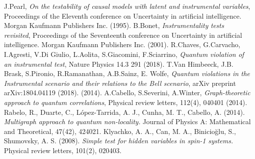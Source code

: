 \documentclass[
    nofootinbin,
    floatfix,
    amsfonts,
    twocolumn, 
    aps, 
    prl]{revtex4-1}
\begin{document}
\begin{thebibliography}{}
     J.Pearl, {\em On the testability of causal models with
        latent and instrumental variables}, 
        Proceedings of the Eleventh conference on Uncertainty in artificial
        intelligence. Morgan Kaufmann Publishers Inc. (1995).
     B.Bonet, {\em Instrumentality tests revisited},
        Proceedings of the Seventeenth conference on Uncertainty in artificial
        intelligence. Morgan Kaufmann Publishers Inc. (2001).
     R.Chaves, G.Carvacho, I.Agresti, V.Di Giulio, L.Aolita,
        S.Giacomini, F.Sciarrino, 
        {\em Quantum violation of an instrumental test}, 
        Nature Physics 14.3 291 (2018).
      T.Van Himbeeck, J.B. Brask, S.Pironio, R.Ramanathan, A.B.Sainz, E. Wolfe, 
        {\em Quantum violations in the Instrumental scenario and their relations to the Bell scenario},
        arXiv preprint arXiv:1804.04119 (2018).
         (2014).
      A.Cabello, S.Severini, A.Winter,
         {\em Graph-theoretic approach to quantum correlations}, 
         Physical review letters, 112(4), 040401 (2014).
      Rabelo, R., Duarte, C., López-Tarrida, A. J., Cunha, M. T., Cabello, A. (2014). {\em Multigraph approach to quantum non-locality.} Journal of Physics A: Mathematical and Theoretical, 47(42), 424021.
      Klyachko, A. A., Can, M. A., Binicioğlu, S., Shumovsky, A. S. (2008). {\em Simple test for hidden variables in spin-1 systems.} Physical review letters, 101(2), 020403.
     
\end{thebibliography}
\end{document}
